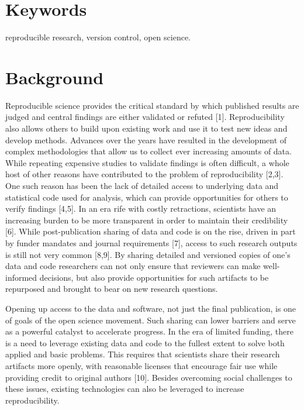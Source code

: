 \documentclass[]{article}
\begin{document}
\section{Keywords}

reproducible research, version control, open science.

\newpage

\section{Background}

Reproducible science provides the critical standard by which published
results are judged and central findings are either validated or refuted
{[}1{]}. Reproducibility also allows others to build upon existing work
and use it to test new ideas and develop methods. Advances over the
years have resulted in the development of complex methodologies that
allow us to collect ever increasing amounts of data. While repeating
expensive studies to validate findings is often difficult, a whole host
of other reasons have contributed to the problem of reproducibility
{[}2,3{]}. One such reason has been the lack of detailed access to
underlying data and statistical code used for analysis, which can
provide opportunities for others to verify findings {[}4,5{]}. In an era
rife with costly retractions, scientists have an increasing burden to be
more transparent in order to maintain their credibility {[}6{]}. While
post-publication sharing of data and code is on the rise, driven in part
by funder mandates and journal requirements {[}7{]}, access to such
research outputs is still not very common {[}8,9{]}. By sharing detailed
and versioned copies of one's data and code researchers can not only
ensure that reviewers can make well-informed decisions, but also provide
opportunities for such artifacts to be repurposed and brought to bear on
new research questions.

Opening up access to the data and software, not just the final
publication, is one of goals of the open science movement. Such sharing
can lower barriers and serve as a powerful catalyst to accelerate
progress. In the era of limited funding, there is a need to leverage
existing data and code to the fullest extent to solve both applied and
basic problems. This requires that scientists share their research
artifacts more openly, with reasonable licenses that encourage fair use
while providing credit to original authors {[}10{]}. Besides overcoming
social challenges to these issues, existing technologies can also be
leveraged to increase reproducibility.
\end{document}
